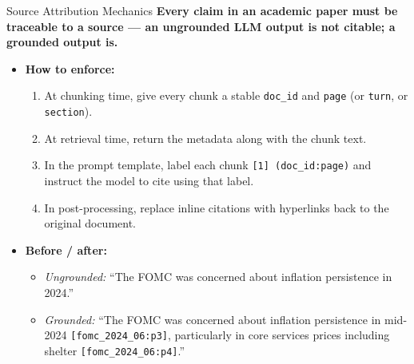 \begin{frame}{Source Attribution Mechanics}
\textbf{Every claim in an academic paper must be traceable to a source --- an ungrounded LLM output is not citable; a grounded output is.}

\medskip
\begin{itemize}
\item \textbf{How to enforce:}
\begin{enumerate}
    \item At chunking time, give every chunk a stable \texttt{doc\_id} and \texttt{page} (or \texttt{turn}, or \texttt{section}).
    \item At retrieval time, return the metadata along with the chunk text.
    \item In the prompt template, label each chunk \texttt{[1] (doc\_id:page)} and instruct the model to cite using that label.
    \item In post-processing, replace inline citations with hyperlinks back to the original document.
\end{enumerate}

\medskip
\item \textbf{Before / after:}
\begin{itemize}
    \item \emph{Ungrounded:} ``The FOMC was concerned about inflation persistence in 2024.''
    \item \emph{Grounded:} ``The FOMC was concerned about inflation persistence in mid-2024 \texttt{[fomc\_2024\_06:p3]}, particularly in core services prices including shelter \texttt{[fomc\_2024\_06:p4]}.''
\end{itemize}
\end{itemize}
\end{frame}

